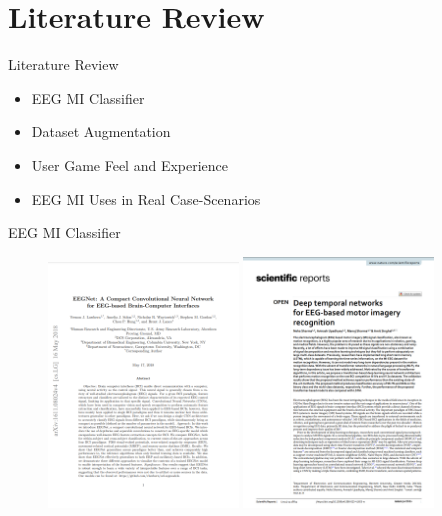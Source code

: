 \section{Literature Review}
\begin{frame}{Literature Review}
\begin{itemize}
    \item EEG MI Classifier
    \item Dataset Augmentation
    \item User Game Feel and Experience
    \item EEG MI Uses in Real Case-Scenarios
\end{itemize}
\end{frame}

\begin{frame}{EEG MI Classifier}
\begin{figure}
    \includegraphics[width=0.45\textwidth]{figures/literature/classifier/EEGNet_paper}
    \includegraphics[width=0.45\textwidth]{figures/literature/classifier/LSTM_Transformer_paper}
\end{figure}
\end{frame}

